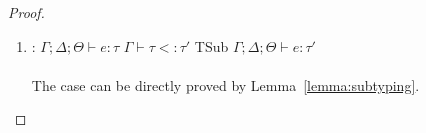 \begin{proof}
\begin{enumerate}[label=Case]
{\begin{alignat}{2}
\\& \forall \sigma\in\denot{\Gamma}. \forall c_x. \primop(\overline{\sigma(v)}) \Downarrow c_x \impl \sigma(e[x\mapsto c_x]) \in \denot{\sigma(\tau)} \ptag{\ref{found:3-9} and $\tau$ is well-formed under $\Gamma$} \label{found:3-10}
\end{alignat}}\noindent
Then it is safe to apply Lemma~\ref{lemma:pure-denot} with $e \mapsto \sigma(\zlet{x{:}b}{\primop\ \overline{v}}{e}), e' \mapsto \sigma(e[x\mapsto c_x]), \tau \mapsto \sigma(\tau)$.
Now, we need to show $\zlet{x{:}b}{\primop\ \overline{v}}{e}$ can reduced into $e[x\mapsto c_x]$ without add new effect, which is can be proved by \textsc{StOp} and the assumption $\primop(\overline{\sigma(v)}) \Downarrow c_x$. Then the proof immediate holds in this case.

\item:
{\footnotesize
\mprooftr{38mm}
{$\Gamma;\Delta;\Theta \vdash e : \tau$ \quad
$\Gamma \vdash \tau <: \tau'$}
{TSub}
{$\Gamma;\Delta;\Theta \vdash e : \tau'$}
\ \\ \ \\}
The case can be directly proved by Lemma~\ref{lemma:subtyping}.
\end{enumerate}
\end{proof}








